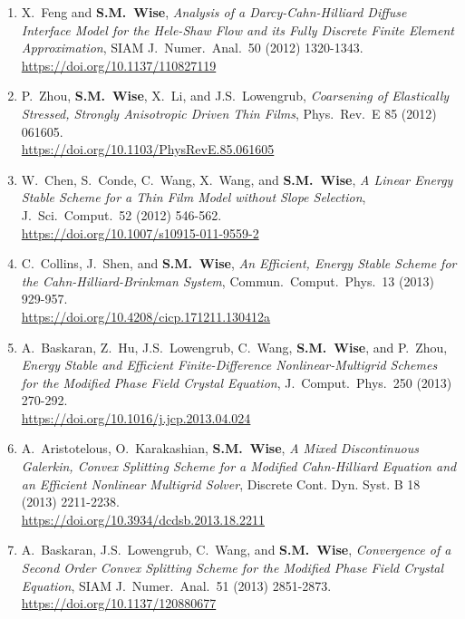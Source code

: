 \documentclass[11pt]{letter}
\begin{document}
\begin{enumerate}
    \item
X.~Feng and \textbf{S.M.~Wise}, {\sl Analysis of a Darcy-Cahn-Hilliard Diffuse Interface Model for the Hele-Shaw Flow and its Fully Discrete Finite Element Approximation}, SIAM J.~Numer.~Anal.~50 (2012) 1320-1343.
	\\
\url{https://doi.org/10.1137/110827119}

    \item
P.~Zhou, \textbf{S.M.~Wise}, X.~Li, and J.S.~Lowengrub, {\sl Coarsening of Elastically Stressed, Strongly Anisotropic Driven Thin Films}, Phys.~Rev.~E 85 (2012) 061605.
	\\
\url{https://doi.org/10.1103/PhysRevE.85.061605}

	\item
W.~Chen, S.~Conde, C.~Wang, X.~Wang, and \textbf{S.M.~Wise}, {\sl A Linear Energy Stable Scheme for a Thin Film Model without Slope Selection}, J.~Sci.~Comput.~52 (2012) 546-562.
	\\
\url{https://doi.org/10.1007/s10915-011-9559-2}

    \item
C.~Collins, J.~Shen, and \textbf{S.M.~Wise}, {\sl An Efficient, Energy Stable Scheme for the Cahn-Hilliard-Brinkman System}, Commun.~Comput.~Phys.~13 (2013) 929-957.
	\\
\url{https://doi.org/10.4208/cicp.171211.130412a}

    \item
A.~Baskaran, Z.~Hu, J.S.~Lowengrub, C.~Wang, \textbf{S.M.~Wise}, and P.~Zhou, {\sl Energy Stable and Efficient Finite-Difference Nonlinear-Multigrid Schemes for the Modified Phase Field Crystal Equation}, J.~Comput.~Phys.~250 (2013) 270-292.
	\\
\url{https://doi.org/10.1016/j.jcp.2013.04.024}

	\item
A.~Aristotelous, O.~Karakashian, \textbf{S.M.~Wise}, {\sl A Mixed Discontinuous Galerkin, Convex Splitting Scheme for a Modified Cahn-Hilliard Equation and an Efficient Nonlinear Multigrid Solver}, Discrete Cont. Dyn. Syst. B 18 (2013) 2211-2238.
	\\
\url{https://doi.org/10.3934/dcdsb.2013.18.2211}

    \item
A.~Baskaran, J.S.~Lowengrub, C.~Wang, and \textbf{S.M.~Wise}, {\sl Convergence of a Second Order Convex Splitting Scheme for the Modified Phase Field Crystal Equation}, SIAM J.~Numer.~Anal.~51 (2013) 2851-2873.
	\\
\url{https://doi.org/10.1137/120880677}


\end{enumerate}
\end{document}
